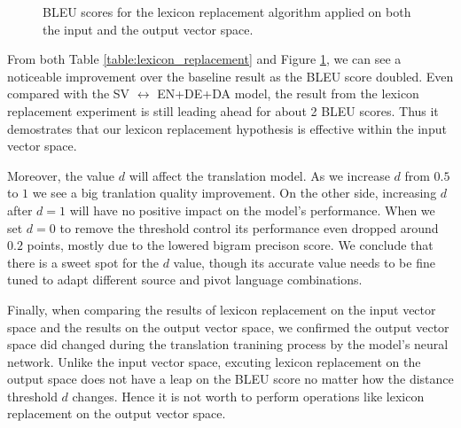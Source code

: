 \documentclass[thesis,fonts=libertine]{cluu}
\begin{document}
\begin{figure}
  \centering
  \caption{BLEU scores for the lexicon replacement algorithm applied on both the input and the output vector space.}
  \label{fig:lexicon_replacement}
\end{figure}

From both Table \ref{table:lexicon_replacement} and Figure \ref{fig:lexicon_replacement}, we can see a noticeable improvement over the baseline result as the BLEU score doubled. Even compared with the SV $\leftrightarrow$ EN+DE+DA model, the result from the lexicon replacement experiment is still leading ahead for about 2 BLEU scores. Thus it demostrates that our lexicon replacement hypothesis is effective within the input vector space.

Moreover, the value $d$ will affect the translation model. As we increase $d$ from $0.5$ to $1$ we see a big tranlation quality improvement. On the other side, increasing $d$ after $d=1$ will have no positive impact on the model's performance. When we set $d=0$ to remove the threshold control its performance even dropped around $0.2$ points, mostly due to the lowered bigram precison score. We conclude that there is a sweet spot for the $d$ value, though its accurate value needs to be fine tuned to adapt different source and pivot language combinations.

Finally, when comparing the results of lexicon replacement on the input vector space and the results on the output vector space, we confirmed the output vector space did changed during the translation tranining process by the model's neural network. Unlike the input vector space, excuting lexicon replacement on the output space does not have a leap on the BLEU score no matter how the distance threshold $d$ changes. Hence it is not worth to perform operations like lexicon replacement on the output vector space.
\end{document}
